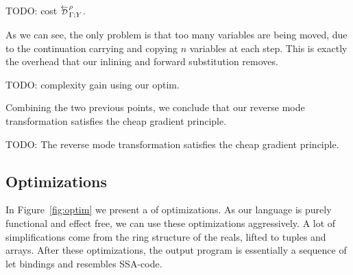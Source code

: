 \begin{proposition}
    TODO: cost $\directD{\rho}{\Gamma}{Y}$. 
\end{proposition}

As we can see, the only problem is that too many variables are being moved, 
due to the continuation carrying and copying $n$ variables at each step.
This is exactly the overhead that our inlining and forward substitution removes.

\begin{proposition}
    TODO: complexity gain using our optim.
\end{proposition}

Combining the two previous points, we conclude that our reverse mode transformation satisfies the cheap gradient principle.

\begin{theorem}
    TODO: The reverse mode transformation satisfies the cheap gradient principle.
\end{theorem}

\subsection{Optimizations} %
\label{sub:Optimizations}

In Figure~\ref{fig:optim} we present a of optimizations. 
As our language is purely functional and effect free, 
we can use these optimizations aggressively. 
A lot of simplifications come from the ring structure of the reals, lifted to tuples and arrays.
After these optimizations, the output program is essentially a sequence of let bindings 
and resembles SSA-code.

